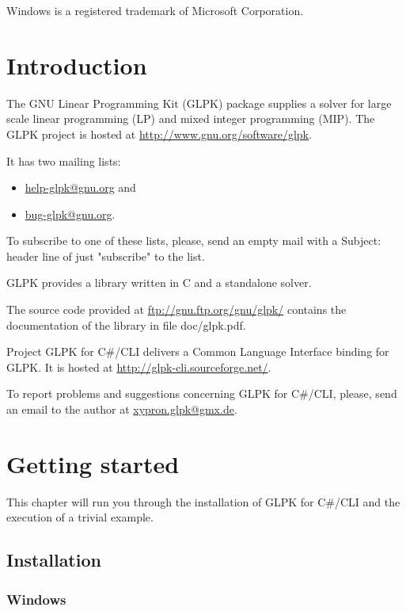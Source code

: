 \documentclass[a4paper,11pt]{report}
\begin{document}
\medskip \noindent
Windows is a registered trademark of Microsoft Corporation. 

\tableofcontents

\chapter{Introduction}
The GNU Linear Programming Kit (GLPK)\cite{GLPK} package supplies a solver for
large scale linear programming (LP) and mixed integer programming (MIP). The
GLPK project is hosted at
\linebreak\href{http://www.gnu.org/software/glpk}{http://www.gnu.org/software/glpk}.

It has two mailing lists:
\begin{itemize}
\item\href{mailto:help-glpk@gnu.org}{help-glpk@gnu.org} and 
\item\href{mailto:bug-glpk@gnu.org}{bug-glpk@gnu.org}.
\end{itemize}
To subscribe to one of these lists, please, send an empty mail with a Subject:
header line of just "subscribe" to the list.

GLPK provides a library written in C and a standalone solver.

The source code provided at
\href{ftp://gnu.ftp.org/gnu/glpk/}{ftp://gnu.ftp.org/gnu/glpk/} contains the
documentation of the library in  file doc/glpk.pdf.

Project GLPK for C\#/CLI delivers a Common Language Interface binding for GLPK.
It is hosted at
\linebreak\href{http://glpk-cli.sourceforge.net/}{http://glpk-cli.sourceforge.net/}.

To report problems and suggestions concerning GLPK for C\#/CLI, please, send an
email to the author at
\href{mailto:xypron.glpk@gmx.de}{xypron.glpk@gmx.de}.

\chapter{Getting started}

This chapter will run you through the installation of GLPK for C\#/CLI and the
execution of a trivial example.

\section{Installation}
\subsection{Windows}
\end{document}
